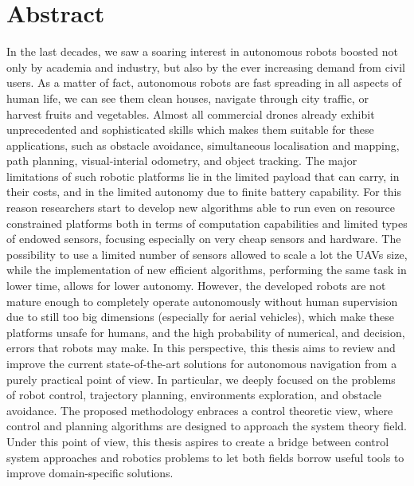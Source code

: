 \begingroup
\let\clearpage\relax
\let\cleardoublepage\relax
\let\cleardoublepage\relax

\chapter*{Abstract}
In the last decades, we saw a soaring interest in autonomous robots boosted not only by academia and industry,
but also by the ever increasing demand from civil users. As a matter of fact, autonomous robots are fast spreading in all aspects
of human life, we can see them clean houses, navigate through city traffic, or harvest fruits and vegetables.
Almost all commercial drones already exhibit unprecedented and sophisticated skills which makes them suitable for these applications,
such as obstacle avoidance, simultaneous localisation and mapping, path planning, visual-interial odometry, and object tracking.
The major limitations of such robotic platforms lie in the limited payload that can carry, in their costs, and in the limited autonomy
due to finite battery capability. For this reason researchers start to develop new algorithms able to run even on resource constrained
platforms both in terms of computation capabilities and limited types of endowed sensors, focusing especially on very cheap sensors
and hardware. The possibility to use a limited number of sensors allowed to scale a lot the UAVs size, while the implementation of
new efficient algorithms, performing the same task in lower time, allows for lower autonomy.
However, the developed robots are not mature enough to completely operate autonomously without human supervision
due to still too big dimensions (especially for aerial vehicles), which make these platforms unsafe for humans, and the
high probability of numerical, and decision, errors that robots may make.
In this perspective, this thesis aims to review and improve the current state-of-the-art solutions for autonomous
navigation from a purely practical point of view. In particular, we deeply focused on the problems of
robot control, trajectory planning, environments exploration, and obstacle avoidance.
The proposed methodology enbraces a control theoretic view, where control and planning algorithms are
designed to approach the system theory field.
Under this point of view, this thesis aspires to create a bridge between control system approaches and
robotics problems to let both fields borrow useful tools to improve domain-specific solutions.

\endgroup
\vfill